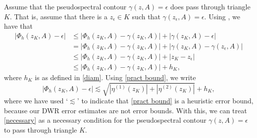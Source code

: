 Assume that the pseudospectral contour $\gamma(z, A)=\epsilon$ does pass through triangle $K.$ That is, assume that there is a $z_{\epsilon} \in K$ such that $\gamma(z_{\epsilon}, A) = \epsilon.$ Using , we have that
\begin{align}
    |\Phi_h(z_K, A) - \epsilon| &\le |\Phi_h(z_K, A) - \gamma(z_K, A)| + |\gamma(z_K, A) - \epsilon |\\
    &= |\Phi_h(z_K, A) - \gamma(z_K, A)| + |\gamma(z_K, A) - \gamma(z_{\epsilon}, A) | \\
    &\le |\Phi_h(z_K, A) - \gamma(z_K, A)| + |z_K - z_{\epsilon}| \\
    &\le |\Phi_h(z_K, A) - \gamma(z_K, A)| + h_K,
\end{align}
where $h_K$ is as defined in \eqref{diam}. Using \eqref{pract bound}, we write
\begin{equation} \label{necessary}
    |\Phi_h(z_K, A) - \epsilon| \lesssim     \sqrt{|\eta^{(1)}(z_K)|
    +|\eta^{(2)}(z_K)|} + h_K,
\end{equation}
where we have used `$\lesssim $' to indicate that \eqref{pract bound} is a heuristic error bound, because our DWR error estimates are not error bounds. With this, we can treat \eqref{necessary} as a necessary condition for the pseudospectral contour $\gamma(z, A) = \epsilon$ to pass through triangle $K.$

